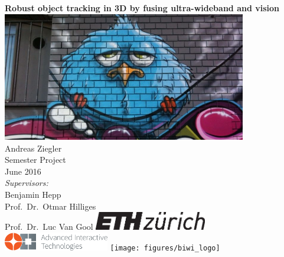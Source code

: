 \documentclass[a4paper,twoside,12pt,nochapterprefix]{scrbook}
\begin{document}
%


\newcommand{\mfytext}[0]{my fancy text}

\newcommand{\chpref}[1]{Chapter \ref{#1}}
\newcommand{\secref}[1]{Section \ref{#1}}
\newcommand{\figref}[1]{Figure \ref{#1}}
\newcommand{\tabref}[1]{Table \ref{#1}}
\newcommand{\apxref}[1]{Appendix \ref{#1}}

%
\begin{titlepage}
	\topmargin 1.0cm
	\oddsidemargin 0.0cm
	\evensidemargin 0.0cm
	\centering
	\Huge
	\vspace{3.0cm}
	\textbf{\textsf{Robust object tracking in 3D by fusing ultra-wideband and vision}} \\[2.0cm]
	\includegraphics*[width=0.8\textwidth]{figures/teaser} \\ %
	\vspace{3cm}
	\sffamily
	\Large
	Andreas Ziegler
	\\[0.8cm]
	\large
	Semester Project %
	\\
	June 2016
	\\[1.3cm]
	\emph{Supervisors:}\\
	Benjamin Hepp\\ 					%
	Prof.\ Dr.\ Otmar Hilliges\\		%
	Prof.\ Dr.\ Luc Van Gool
	\vfill
	\includegraphics*[height=0.8cm]{figures/eth_logo_kurz_pos.eps} \hfill
	\includegraphics*[height=0.8cm]{figures/logo-ait} \hfill
	\texttt{[image: figures/biwi\_logo]}
	\vspace{3.4cm}
\end{titlepage}
\clearemptydoublepage
\end{document}
